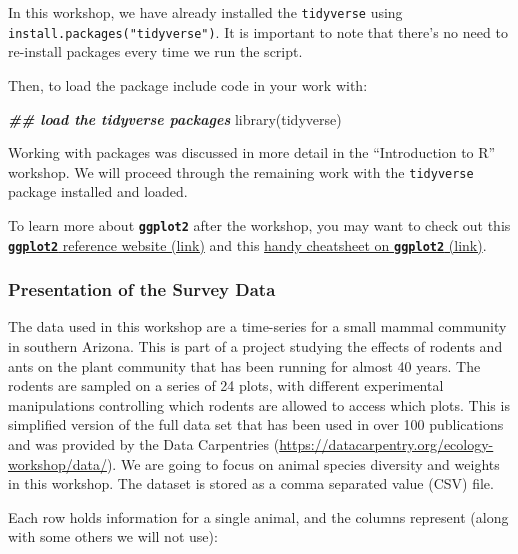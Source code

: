 \documentclass[
]{article}
\newenvironment{Shaded}{\begin{snugshade}}{\end{snugshade}}
\newcommand{\DocumentationTok}[1]{\textcolor[rgb]{0.56,0.35,0.01}{\textbf{\textit{#1}}}}
\newcommand{\FunctionTok}[1]{\textcolor[rgb]{0.00,0.00,0.00}{#1}}
\newcommand{\NormalTok}[1]{#1}
\begin{document}
In this workshop, we have already installed the \texttt{tidyverse} using
\texttt{install.packages("tidyverse")}. It is important to note that
there's no need to re-install packages every time we run the script.

Then, to load the package include code in your work with:

\begin{Shaded}
\begin{Highlighting}[]
\DocumentationTok{\#\# load the tidyverse packages}
\FunctionTok{library}\NormalTok{(tidyverse)}
\end{Highlighting}
\end{Shaded}

Working with packages was discussed in more detail in the ``Introduction
to R'' workshop. We will proceed through the remaining work with the
\texttt{tidyverse} package installed and loaded.

To learn more about \textbf{\texttt{ggplot2}} after the workshop, you
may want to check out this
\href{https://ggplot2.tidyverse.org/reference/}{\textbf{\texttt{ggplot2}}
reference website (link)} and this
\href{https://github.com/rstudio/cheatsheets/raw/master/data-visualization-2.1.pdf}{handy
cheatsheet on \textbf{\texttt{ggplot2}} (link)}.

\hypertarget{presentation-of-the-survey-data}{%
\subsubsection{Presentation of the Survey
Data}\label{presentation-of-the-survey-data}}

The data used in this workshop are a time-series for a small mammal
community in southern Arizona. This is part of a project studying the
effects of rodents and ants on the plant community that has been running
for almost 40 years. The rodents are sampled on a series of 24 plots,
with different experimental manipulations controlling which rodents are
allowed to access which plots. This is simplified version of the full
data set that has been used in over 100 publications and was provided by
the Data Carpentries
(\url{https://datacarpentry.org/ecology-workshop/data/}). We are going
to focus on animal species diversity and weights in this workshop. The
dataset is stored as a comma separated value (CSV) file.

\newpage

Each row holds information for a single animal, and the columns
represent (along with some others we will not use):
\end{document}
